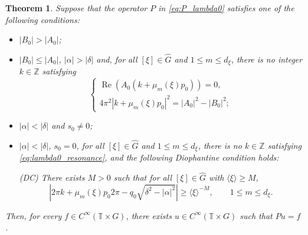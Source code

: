 \documentclass[11pt,reqno]{amsart}
\numberwithin{equation}{section}
\newtheorem{theorem}{Theorem}[section]
\begin{document}
	\begin{theorem}\label{thm:lambda0_cases}
		Suppose that the operator $P$ in \eqref{eq:P_lambda0} satisfies one of the following conditions:
		\begin{itemize}
			\item[(1)] $|B_0| > |A_0|$;
			\item[(2)] $|B_0| \le |A_0|$, $|\alpha| > |\delta|$ and, for all $[\xi] \in \widehat{G}$ and $1 \le m \le d_\xi$, there is no integer $k \in \mathbb{Z}$ satisfying
			\begin{equation}\label{eq:lambda0_resonance}
				\begin{cases}
					\operatorname{Re}(A_0(k + \mu_m(\xi)p_0)) = 0, \\
					4\pi^2 |k + \mu_m(\xi)p_0|^2 = |A_0|^2 - |B_0|^2;
				\end{cases}
			\end{equation}
			\item[(3)] $|\alpha| < |\delta|$ and $s_0 \neq 0$;
			\item[(4)] $|\alpha| < |\delta|$, $s_0 = 0$, for all $[\xi] \in \widehat{G}$ and $1 \le m \le d_\xi$, there is no $k \in \mathbb{Z}$ satisfying \eqref{eq:lambda0_resonance}, and the following Diophantine condition holds:
			
			\medskip\noindent
			\textup{(DC)} There exists $M > 0$ such that for all $[\xi] \in \widehat{G}$ with $\langle\xi\rangle \ge M$,
			\[
			|2\pi k + \mu_m(\xi)p_0 2\pi - q_0\sqrt{\delta^2 - |\alpha|^2}| \ge \langle\xi\rangle^{-M},
			\qquad 1 \le m \le d_\xi.
			\]
		\end{itemize}
		
		Then, for every $f \in C^\infty(\mathbb{T} \times G)$, there exists $u \in C^\infty(\mathbb{T} \times G)$ such that $Pu = f$.
	\end{theorem}
\end{document}
